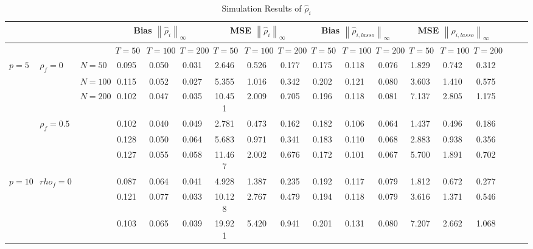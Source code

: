 \documentclass[11pt,a4paper]{article}
\theoremstyle{definition}
\newcommand{\norm}[1]{\left\lVert#1\right\rVert}
\begin{document}
\begin{landscape}
\begin{center}
\begin{longtable}{lllccccccccccccccc}
\caption{Simulation Results of $\hat\rho_i$} \label{Table_b} \\
\toprule
 & & & \multicolumn{3}{c}{Bias $\norm{\hat\rho_i}_{\infty}$} & \multicolumn{3}{c}{MSE $\norm{\hat\rho_i}_{\infty}$} & \multicolumn{3}{c}{Bias $\norm{\hat\rho_{i,lasso}}_{\infty}$} & \multicolumn{3}{c}{MSE $\norm{\hat\rho_{i,lasso}}_{\infty}$} \\
\midrule
        &               &         & $T=50$ &  $T=100$ & $T=200$& $T=50$ &  $T=100$ & $T=200$ & $T=50$ & $T=100$ & $T=200$ & $T=50$ & $T=100$ & $T=200$ \\
\cmidrule(lr){4-6}\cmidrule(lr){7-9}\cmidrule(lr){10-12}\cmidrule(lr){13-15}
  $p=5$ &    $\rho_f=0$ &   $N=50$ &  0.095 &  0.050 &  0.031 &   2.646 &    0.526 &  0.177 &  0.175 &  0.118 &  0.076 &  1.829 &  0.742 &  0.312 \\
        &               &  $N=100$ &  0.115 &  0.052 &  0.027 &   5.355 &    1.016 &  0.342 &  0.202 &  0.121 &  0.080 &  3.603 &  1.410 &  0.575 \\
        &               &  $N=200$ &  0.102 &  0.047 &  0.035 &  10.451 &    2.009 &  0.705 &  0.196 &  0.118 &  0.081 &  7.137 &  2.805 &  1.175 \\
\cmidrule(lr){4-6}\cmidrule(lr){7-9}\cmidrule(lr){10-12}\cmidrule(lr){13-15}
        &  $\rho_f=0.5$ &          &  0.102 &  0.040 &  0.049 &   2.781 &    0.473 &  0.162 &  0.182 &  0.106 &  0.064 &  1.437 &  0.496 &  0.186 \\
        &               &          &  0.128 &  0.050 &  0.064 &   5.683 &    0.971 &  0.341 &  0.183 &  0.110 &  0.068 &  2.883 &  0.938 &  0.356 \\
        &               &          &  0.127 &  0.055 &  0.058 &  11.467 &    2.002 &  0.676 &  0.172 &  0.101 &  0.067 &  5.700 &  1.891 &  0.702 \\
\midrule
 $p=10$ &     $rho_f=0$ &          &  0.087 &  0.064 &  0.041 &   4.928 &    1.387 &  0.235 &  0.192 &  0.117 &  0.079 &  1.812 &  0.672 &  0.277 \\
        &               &          &  0.121 &  0.077 &  0.033 &  10.128 &    2.767 &  0.479 &  0.194 &  0.118 &  0.079 &  3.616 &  1.371 &  0.546 \\
        &               &          &  0.103 &  0.065 &  0.039 &  19.921 &    5.420 &  0.941 &  0.201 &  0.131 &  0.080 &  7.207 &  2.662 &  1.068 \\

\end{longtable}
\end{center}
\end{landscape}
\end{document}
